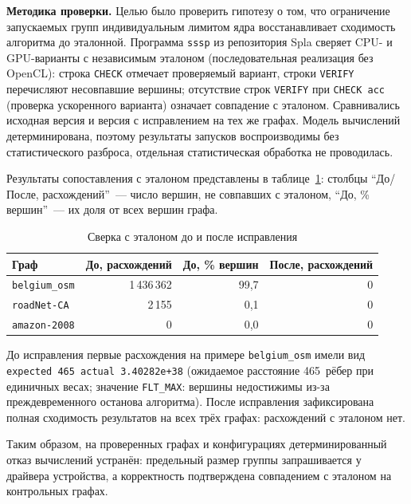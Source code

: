 \documentclass[a4paper]{article}
\begin{document}
\textbf{Методика проверки.} Целью было проверить гипотезу о том, что ограничение запускаемых групп индивидуальным лимитом ядра восстанавливает сходимость алгоритма до эталонной. Программа \texttt{sssp} из репозитория Spla сверяет CPU- и GPU-варианты с независимым эталоном (последовательная реализация без OpenCL): строка \texttt{CHECK} отмечает проверяемый вариант, строки \texttt{VERIFY} перечисляют несовпавшие вершины; отсутствие строк \texttt{VERIFY} при \texttt{CHECK acc} (проверка ускоренного варианта) означает совпадение с эталоном. Сравнивались исходная версия и версия с исправлением на тех же графах. Модель вычислений детерминирована, поэтому результаты запусков воспроизводимы без статистического разброса, отдельная статистическая обработка не проводилась.

Результаты сопоставления с эталоном представлены в таблице~\ref{tab:verify}: столбцы \enquote{До/После, расхождений}~--- число вершин, не совпавших с эталоном, \enquote{До, \% вершин}~--- их доля от всех вершин графа.

\begin{table}[htbp]
    \centering
    \caption{Сверка с эталоном до и после исправления}
    \label{tab:verify}
    \begin{tabular}{lrrr}
        \toprule
        \textbf{Граф} & \textbf{До, расхождений} & \textbf{До, \% вершин} & \textbf{После, расхождений} \\
        \midrule
        \texttt{belgium\_osm} & 1\,436\,362 & 99,7 & 0 \\
        \texttt{roadNet-CA} & 2\,155 & 0,1 & 0 \\
        \texttt{amazon-2008} & 0 & 0,0 & 0 \\
        \bottomrule
    \end{tabular}
\end{table}

До исправления первые расхождения на примере \texttt{belgium\_osm} имели вид \texttt{expected 465 actual 3.40282e+38} (ожидаемое расстояние 465~рёбер при единичных весах; значение \texttt{FLT\_MAX}: вершины недостижимы из-за преждевременного останова алгоритма). После исправления зафиксирована полная сходимость результатов на всех трёх графах: расхождений с эталоном нет.

Таким образом, на проверенных графах и конфигурациях детерминированный отказ вычислений устранён: предельный размер группы запрашивается у драйвера устройства, а корректность подтверждена совпадением с эталоном на контрольных графах.
\end{document}
